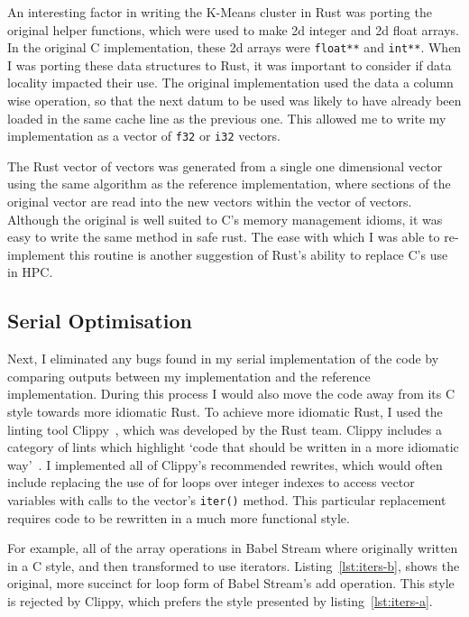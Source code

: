 An interesting factor in writing the K-Means cluster in Rust was porting the original helper functions, which were used to make 2d integer and 2d float arrays. In the original C implementation, these 2d arrays were \texttt{float**} and \texttt{int**}. When I was porting these data structures to Rust, it was important to consider if data locality impacted their use. The original implementation used the data a column wise operation, so that the next datum to be used was likely to have already been loaded in the same cache line as the previous one. This allowed me to write my implementation as a vector of \texttt{f32} or \texttt{i32} vectors.

The Rust vector of vectors was generated from a single one dimensional vector using the same algorithm as the reference implementation, where sections of the original vector are read into the new vectors within the vector of vectors. Although the original is well suited to C's memory management idioms, it was easy to write the same method in safe rust. The ease with which I was able to re-implement this routine is another suggestion of Rust's ability to replace C's use in HPC.

\subsection{Serial Optimisation}
Next, I eliminated any bugs found in my serial implementation of the code by comparing outputs between my implementation and the reference implementation. During this process I would also move the code away from its C style towards more idiomatic Rust. To achieve more idiomatic Rust, I used the linting tool Clippy~\cite{RustClippy}, which was developed by the Rust team.  Clippy includes a category of lints  which highlight `code that should be written in a more idiomatic way'~\cite{RustClippy}. I implemented all of Clippy's recommended rewrites, which would often include replacing the use of for loops over integer indexes to access vector variables with calls to the vector's \texttt{iter()} method. This particular replacement requires code to be rewritten in a much more functional style.

For example, all of the array operations in Babel Stream where originally written in a C style, and then transformed to use iterators. Listing~\ref{lst:iters-b}, shows the original, more succinct for loop form of Babel Stream's add operation. This style is rejected by Clippy, which prefers the style presented by listing~\ref{lst:iters-a}.

